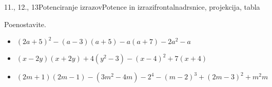 \begin{priprava}{11., 12., 13}{}{Potenciranje izrazov}{Potence in izrazi}{frontalna}{drsnice, projekcija, tabla}
\begin{multicols}{2}
            \end{multicols}

                \begin{naloga}
                    Poenostavite.
                    \begin{itemize}
                        \item $(2a+5)^2-(a-3)(a+5)-a(a+7)-2a^2-a$ 
                        \item $(x-2y)(x+2y)+4(y^2-3)-(x-4)^2+7(x+4)$ 
                        \item $(2m+1)(2m-1)-(3m^2-4m)-2^4-(m-2)^3+(2m-3)^2+m^2m$ 
                    \end{itemize}
                \end{naloga}


    

\end{priprava}